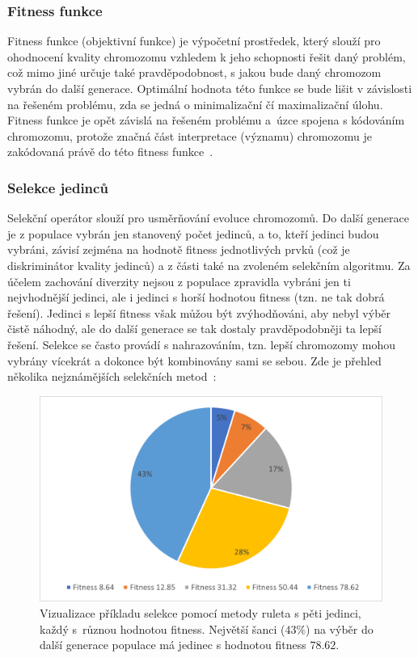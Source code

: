 \subsubsection{Fitness funkce}
Fitness funkce (objektivní funkce) je výpočetní prostředek, který slouží pro ohodnocení kvality chromozomu vzhledem k jeho schopnosti řešit daný problém, což mimo jiné určuje také pravděpodobnost, s jakou bude daný chromozom vybrán do další generace. Optimální hodnota této funkce se bude lišit v závislosti na řešeném problému, zda se jedná o minimalizační čí maximalizační úlohu. Fitness funkce je opět závislá na řešeném problému a~úzce spojena s kódováním chromozomu, protože značná část interpretace (významu) chromozomu je zakódovaná právě do této fitness funkce~\cite{GAoptimisModel}. 

\subsubsection{Selekce jedinců}
\label{selekceGA}
Selekční operátor slouží pro usměrňování evoluce chromozomů. Do další generace je z populace vybrán jen stanovený počet jedinců, a to, kteří jedinci budou vybráni, závisí zejména na hodnotě fitness jednotlivých prvků (což je diskriminátor kvality jedinců) a z části také na zvoleném selekčním algoritmu. Za účelem zachování diverzity nejsou z populace zpravidla vybráni jen ti nejvhodnější jedinci, ale i jedinci s horší hodnotou fitness (tzn. ne tak dobrá řešení). Jedinci s lepší fitness však můžou být zvýhodňováni, aby nebyl výběr čistě náhodný, ale do další generace se tak dostaly pravděpodobněji ta lepší řešení. Selekce se často provádí s nahrazováním, tzn. lepší chromozomy mohou vybrány vícekrát a dokonce být kombinovány sami se sebou. Zde je přehled několika nejznámějších selekčních metod~\cite{GAoptimisModel, introductionEvo, GAstudy}:

\begin{figure}[t]
    \centering
    \includegraphics[width=0.9\linewidth]{figures/slap_ea/Roulette.png}
    \caption{Vizualizace příkladu selekce pomocí metody ruleta s pěti jedinci, každý s~různou hodnotou fitness. Největší šanci ($43\%$) na výběr do další generace populace má jedinec s hodnotou fitness $78.62$.}
    \label{fig:roulette}
\end{figure}


